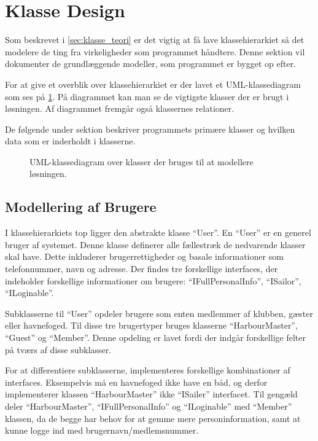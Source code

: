 \section{Klasse Design}
\label{sec:klasse_design}
Som beskrevet i \cref{sec:klasse_teori} er det vigtig at få lave klassehierarkiet så det modelere de ting fra virkeligheder som programmet håndtere. Denne sektion vil dokumenter de grundlæggende modeller, som programmet er bygget op efter. 

For at give et overblik over klassehierarkiet er der lavet et UML-klassediagram som ses på \cref{fig:UML}. På diagrammet kan man se de vigtigste klasser der er brugt i løsningen. Af diagrammet fremgår også klassernes relationer.

De følgende under sektion beskriver programmets primære klasser og hvilken data som er inderholdt i klasserne.


\begin{figure}
  \centering
  \vspace*{-4.5cm}
 	\caption{UML-klassediagram over klasser der bruges til at modellere løsningen.} \label{fig:UML}  
 \end{figure}


\subsection{Modellering af Brugere}
\label{sub:brugere_af_programmet}

I klassehierarkiets top ligger den abstrakte klasse \enquote{User}. En \enquote{User} er en generel bruger af systemet. Denne klasse definerer alle fællestræk de nedvarende klasser skal have. Dette inkluderer brugerrettigheder og basale informationer som telefonnummer, navn og adresse. Der findes tre forskellige interfaces, der indeholder forskellige informationer om brugere: \enquote{IFullPersonalInfo}, \enquote{ISailor}, \enquote{ILoginable}.

Subklasserne til \enquote{User} opdeler brugere som enten medlemmer af klubben, gæster eller havnefoged. Til disse tre brugertyper bruges klasserne \enquote{HarbourMaster}, \enquote{Guest} og \enquote{Member}. Denne opdeling er lavet fordi der indgår forskellige felter på tværs af disse subklasser. 


For at differentiere subklasserne, implementeres forskellige kombinationer af interfaces. Eksempelvis må en havnefoged ikke have en båd, og derfor implementerer klassen \enquote{HarbourMaster} ikke \enquote{ISailer} interfacet. Til gengæld deler \enquote{HarbourMaster}, \enquote{IFullPersonalInfo} og \enquote{ILoginable} med \enquote{Member} klassen, da de begge har behov for at gemme mere personinformation, samt at kunne logge ind med brugernavn/medlemsnummer.
 
